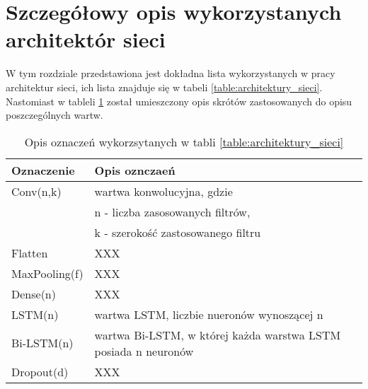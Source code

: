 \newpage %
\section{Szczegółowy opis wykorzystanych architektór sieci}

W tym rozdziale przedstawiona jest dokładna lista wykorzystanych w pracy architektur sieci, ich lista znajduje się w tabeli \ref{table:architektury_sieci}. Nastomiast w tableli \ref{tab:oznaczenia_warstw} został umieszczony opis skrótów zastosowanych do opisu poszczególnych wartw.



\begin{table}[!h]  \centering
    \caption{Opis oznaczeń wykorzsytanych w tabli \ref{table:architektury_sieci}}
    \label{tab:oznaczenia_warstw}
    \begin{tabular} {| l | l |} \hline
        Oznaczenie    & Opis oznczaeń                                                  \\ \hline
        Conv(n,k)     & wartwa konwolucyjna, gdzie                                     \\ & n - liczba zasosowanych filtrów, \\ & k - szerokość zastosowanego filtru \\ \hline
        Flatten       & XXX                                                            \\ \hline
        MaxPooling(f) & XXX                                                            \\ \hline
        Dense(n)      & XXX                                                            \\ \hline
        LSTM(n)       & wartwa LSTM, liczbie nueronów wynoszącej n                     \\ \hline
        Bi-LSTM(n)    & wartwa Bi-LSTM, w której każda warstwa LSTM posiada n neuronów \\ \hline
        Dropout(d)    & XXX                                                            \\ \hline
    \end{tabular}
\end{table}

